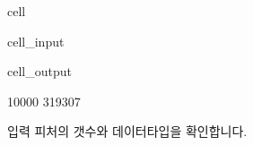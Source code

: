 \documentclass[letterpaper,10pt,english]{jupyterBook}
\begin{document}
\begin{sphinxuseclass}{cell}\begin{sphinxVerbatimInput}

\begin{sphinxuseclass}{cell_input}
\begin{sphinxVerbatim}[commandchars=\\\{\}]
  \PYG{p}{[}\PYG{p}{]}

   
  \PYG{p}{[}\PYG{p}{]}
 
\end{sphinxVerbatim}

\end{sphinxuseclass}\end{sphinxVerbatimInput}
\begin{sphinxVerbatimOutput}

\begin{sphinxuseclass}{cell_output}
\begin{sphinxVerbatim}[commandchars=\\\{\}]
10000 319307
\end{sphinxVerbatim}

\end{sphinxuseclass}\end{sphinxVerbatimOutput}

\end{sphinxuseclass}
\sphinxAtStartPar
입력 피처의 갯수와 데이터타입을 확인합니다.
\end{document}
